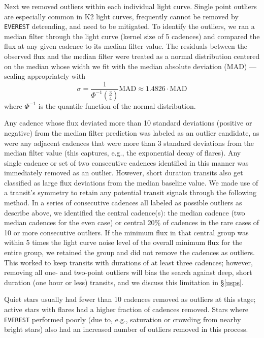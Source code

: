 \documentclass[twocolumn]{aastex62}
\newcommand{\pipeline}[1]{\texttt{#1}}
\begin{document}


Next we removed outliers within each individual light curve. Single
point outliers are especially common in K2 light curves, frequently
cannot be removed by \pipeline{EVEREST} detrending, and need to be
mitigated.  To identify the outliers, we ran a median filter through
the light curve (kernel size of 5 cadences) and compared the flux at
any given cadence to its median filter value. The residuals between
the observed flux and the median filter were treated as a normal
distribution centered on the median whose width we fit with the median
absolute deviation (MAD) --- scaling appropriately with
\[ \sigma = \frac{1}{\Phi^{-1}\left(\frac{3}{4}\right)} \text{MAD} 
\approx 1.4826 \cdot \text{MAD} \] where $\Phi^{-1}$ is the quantile
function of the normal distribution.

Any cadence whose flux deviated more than 10 standard deviations
(positive or negative) from the median filter prediction was labeled
as an outlier candidate, as were any adjacent cadences that were more
than 3 standard deviations from the median filter value (this
captures, e.g., the exponential decay of flares). Any single cadence
or set of two consecutive cadences identified in this manner was
immediately removed as an outlier. However, short duration transits
also get classified as large flux deviations from the median baseline
value. We made use of a transit's symmetry to retain any potential
transit signals through the following method.  In a series of
consecutive cadences all labeled as possible outliers as describe
above, we identified the central cadence(s): the median cadence (two
median cadences for the even case) or central 20\% of cadences in the
rare cases of 10 or more consecutive outliers. If the minimum flux in
that central group was within 5 times the light curve noise level of
the overall minimum flux for the entire group, we retained the group
and did not remove the cadences as outliers. This worked to keep
transits with durations of at least three cadences; however, removing
all one- and two-point outliers will bias the search against deep,
short duration (one hour or less) transits, and we discuss this
limitation in \S\ref{usps}.

Quiet stars usually had fewer than 10 cadences removed as outliers at
this stage; active stars with flares had a higher fraction of cadences
removed. Stars where \pipeline{EVEREST} performed poorly (due to,
e.g., saturation or crowding from nearby bright stars) also had an
increased number of outliers removed in this process.
\end{document}
